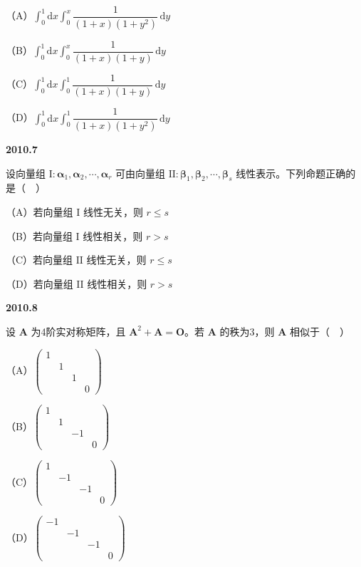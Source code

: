 \documentclass[UTF8,12pt,fontset=windows]{ctexart}
\begin{document}
（A）$\int_0^1 \mathrm{d}x \int_0^x \dfrac{1}{(1+x)(1+y^2)} \,\mathrm{d}y$

（B）$\int_0^1 \mathrm{d}x \int_0^x \dfrac{1}{(1+x)(1+y)} \,\mathrm{d}y$

（C）$\int_0^1 \mathrm{d}x \int_0^1 \dfrac{1}{(1+x)(1+y)} \,\mathrm{d}y$

（D）$\int_0^1 \mathrm{d}x \int_0^1 \dfrac{1}{(1+x)(1+y^2)} \,\mathrm{d}y$

\vfill
\newpage
{\large\bfseries 2010.7}

设向量组 $\text{I}: \boldsymbol{\alpha}_1, \boldsymbol{\alpha}_2, \cdots, \boldsymbol{\alpha}_r$ 可由向量组 $\text{II}: \boldsymbol{\beta}_1, \boldsymbol{\beta}_2, \cdots, \boldsymbol{\beta}_s$ 线性表示。下列命题正确的是（　）

（A）若向量组 $\text{I}$ 线性无关，则 $r \leqslant s$

（B）若向量组 $\text{I}$ 线性相关，则 $r > s$

（C）若向量组 $\text{II}$ 线性无关，则 $r \leqslant s$

（D）若向量组 $\text{II}$ 线性相关，则 $r > s$

\vfill
\newpage
{\large\bfseries 2010.8}

设 $\boldsymbol{A}$ 为4阶实对称矩阵，且 $\boldsymbol{A}^2 + \boldsymbol{A} = \boldsymbol{O}$。若 $\boldsymbol{A}$ 的秩为3，则 $\boldsymbol{A}$ 相似于（　）

（A）$\begin{pmatrix} 1 & & & \\ & 1 & & \\ & & 1 & \\ & & & 0 \end{pmatrix}$

（B）$\begin{pmatrix} 1 & & & \\ & 1 & & \\ & & -1 & \\ & & & 0 \end{pmatrix}$

（C）$\begin{pmatrix} 1 & & & \\ & -1 & & \\ & & -1 & \\ & & & 0 \end{pmatrix}$

（D）$\begin{pmatrix} -1 & & & \\ & -1 & & \\ & & -1 & \\ & & & 0 \end{pmatrix}$
\end{document}

